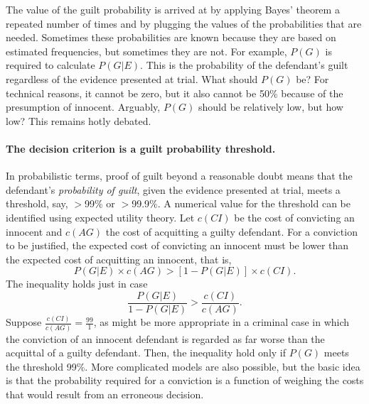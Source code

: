 \documentclass[10pt]{article}
\begin{document}
The value of the guilt probability is arrived at by applying Bayes' theorem a 
repeated number of times and by plugging the values of the probabilities that are needed. 
Sometimes these probabilities are known because they are based on estimated frequencies, but sometimes 
they are not. For example, $P(G)$ is required to calculate $P(G|E)$. 
This is the probability of the defendant's guilt regardless of the evidence 
presented at trial. What should $P(G)$ be?
For technical reasons, it cannot be zero, but it also cannot be 50\% because 
of the presumption of innocent. Arguably, $P(G)$ should be relatively low, but how low?
This remains  hotly debated. 


\paragraph{The decision criterion is a guilt probability threshold.}

In probabilistic terms, proof of guilt beyond a reasonable doubt means 
that the defendant's \textit{probability of guilt}, given the evidence presented at trial, meets a 
threshold, say, $>$99\% or $>$99.9\%. 
%
A numerical value for the threshold can be identified using expected utility theory. 
Let $c(CI)$ be the cost of convicting an innocent and $c(AG)$ the cost 
of acquitting a guilty defendant. For a conviction to be justified, the 
expected cost of convicting an innocent must be lower than the expected 
cost of acquitting an innocent, that is, 
%
\[ P(G|E) \times c(AG) >  [1-P(G|E)] \times c(CI) .\]
%
The inequality holds just in case 
%
\[ \frac{P(G|E)}{1- P(G|E)} > \frac{c(CI)}{c(AG)}.\]
%
Suppose $ \frac{c(CI)}{c(AG)}=\frac{99}{1}$, as might be more appropriate in a criminal 
case in which the conviction of an innocent defendant is regarded as far worse than the acquittal of a guilty defendant.
Then, the inequality hold only if $P(G)$ meets the threshold 99\%.
More complicated models are also possible, but the basic idea is that the probability 
required for a conviction is a function of weighing the 
costs that would result from an erroneous decision. 
\end{document}
